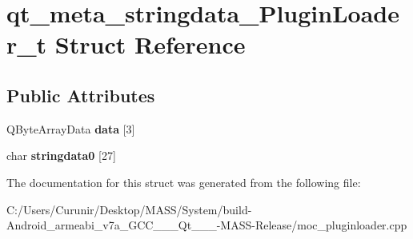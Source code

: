\hypertarget{structqt__meta__stringdata___plugin_loader__t}{}\section{qt\+\_\+meta\+\_\+stringdata\+\_\+\+Plugin\+Loader\+\_\+t Struct Reference}
\label{structqt__meta__stringdata___plugin_loader__t}
\subsection*{Public Attributes}
\begin{DoxyCompactItemize}
\item 
\mbox{\label{structqt__meta__stringdata___plugin_loader__t_a85ab98dc6a2ebb8bfb45ad9d79f18544}} 
Q\+Byte\+Array\+Data {\bfseries data} \mbox{[}3\mbox{]}
\item 
\mbox{\label{structqt__meta__stringdata___plugin_loader__t_ad47cb9c36ad1366ad0c23dbd8fe8cdee}} 
char {\bfseries stringdata0} \mbox{[}27\mbox{]}
\end{DoxyCompactItemize}


The documentation for this struct was generated from the following file\+:\begin{DoxyCompactItemize}
\item 
C\+:/\+Users/\+Curunir/\+Desktop/\+M\+A\+S\+S/\+System/build-\/\+Android\+\_\+armeabi\+\_\+v7a\+\_\+\+G\+C\+C\+\_\+\_\+\_\+\+Qt\+\_\+\_\+\_-\/\+M\+A\+S\+S-\/\+Release/moc\+\_\+pluginloader.\+cpp\end{DoxyCompactItemize}
